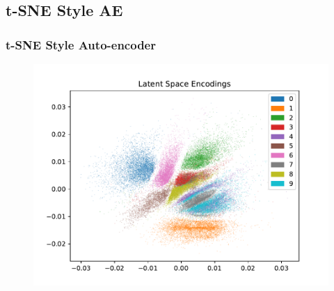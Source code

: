 \documentclass[10pt, usenames, dvipsnames, table]{beamer}
\begin{document}
\subsection{t-SNE Style AE}


\begin{frame}
  \frametitle{t-SNE Style Auto-encoder}
  \begin{figure}
    \centering
    \includegraphics[width=\linewidth]
    {models/mnist_student_e300_L2_b64/encodings}
    \caption{}
    \label{}
  \end{figure}
\end{frame}
\end{document}
